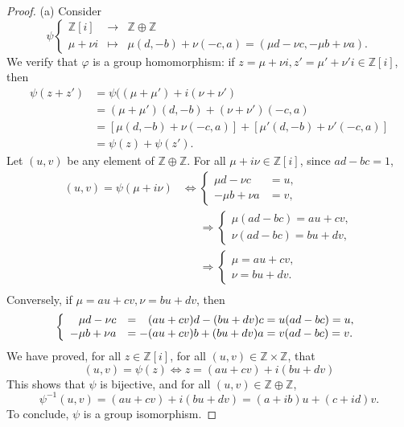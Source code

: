 \documentclass[11pt,a4paper]{article}
\newcommand{\Z}{\mathbb{Z}}
\begin{document}
\begin{proof} 
\item[(a)] Consider
$$
\psi 
\left\{
\begin{array}{ccl}
\Z[i] &\to& \Z \oplus \Z\\
\mu + \nu i & \mapsto & \mu(d,-b) + \nu (-c,a) = (\mu d - \nu c, - \mu b + \nu a).
\end{array}
\right.
$$
We verify that $\varphi$ is a group homomorphism: if $z = \mu + \nu i, z' = \mu' + \nu' i \in \Z[i]$, then
\begin{align*}
\psi(z+ z') &= \psi((\mu+\mu') + i (\nu + \nu')\\
&= (\mu + \mu')(d,-b) + (\nu + \nu')(-c,a)\\
&= [\mu(d,-b) + \nu (-c,a)] + [\mu'(d,-b) + \nu' (-c,a) ]\\
&= \psi(z) + \psi(z').
\end{align*}
Let $(u,v)$ be any element of $\Z \oplus \Z$. For all $\mu + i \nu \in \Z[i]$, since $ad - bc = 1$,
\begin{align*}
(u,v) = \psi(\mu + i \nu) & \iff
\left\{
\begin{array}{rl}
\mu d - \nu c &= u,\\
-\mu b + \nu a &= v,
\end{array}
\right.\\
&\phantom{\Leftarrow}\Rightarrow 
\left\{
\begin{array}{rl}
\mu(ad-bc) = au + cv,\\
\nu(ad-bc) = bu + dv,
\end{array}
\right.\\
&\phantom{\Leftarrow}\Rightarrow 
\left\{
\begin{array}{rl}
\mu = au + cv,\\
\nu = bu + dv.
\end{array}
\right.\\
\end{align*}
Conversely, if $\mu = au + cv, \nu = bu + dv$, then
$$
\left\{
\begin{array}{rl}
\mu d - \nu c &= \phantom{-}(au + cv) d - (bu + dv) c= u(ad-bc) = u, \\
-\mu b + \nu a &= -(au + cv)b + (bu+dv)a = v(ad -bc) = v.
\end{array}
\right.\\
$$
We have proved, for all $z \in \Z[i]$, for all $(u,v) \in \Z \times \Z$, that
$$(u,v) = \psi(z) \iff z = (au +cv) + i(bu+dv)$$
This shows that $\psi$ is bijective, and for all $(u,v) \in \Z \oplus \Z$,$$\psi^{-1}(u,v) = (au+cv) + i (bu +dv)= (a+ib) u + (c + id) v.$$
To conclude, $\psi$ is a group isomorphism.


\end{proof}
\end{document}
